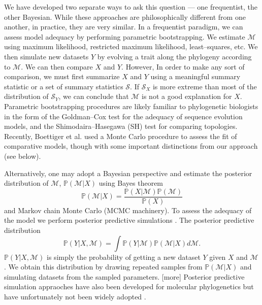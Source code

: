 \documentclass[a4paper,12pt]{article}
\begin{document}
We have developed two separate ways to ask this question --- one frequentist, the other Bayesian. While these approaches are philosophically different from one another, in practice, they are very similar. In a frequentist paradigm, we can assess model adequacy by performing parametric bootstrapping. We estimate $\mathcal{M}$ using maximum likelihood, restricted maximum likelihood, least--squares, etc. We then simulate new datasets $Y$ by evolving a trait along the phylogeny according to $\mathcal{M}$. We can then compare $X$ and $Y$. However, In order to make any sort of comparison, we must first summarize $X$ and $Y$ using a meaningful summary statistic or a set of summary statistics $\mathcal{S}$. If $\mathcal{S}_X$ is more extreme than most of the distribution of $\mathcal{S}_Y$, we can conclude that $\mathcal{M}$ is not a good explanation for $X$. Parametric bootstrapping procedures are likely familiar to phylogenetic biologists in the form of the Goldman--Cox test \citep{Goldman1993} for the adequacy of sequence evolution models, and the Shimodaira--Hasegawa (SH) \citep{SH} test for comparing topologies. Recently, Boettiger et al. \citep{Boettiger2012} used a Monte Carlo procedure to assess the fit of comparative models, though with some important distinctions from our approach (see below).

Alternatively, one may adopt a Bayesian perspective and estimate the posterior distribution of $\mathcal{M}$, $\mathbb{P}(\mathcal{M}|X)$ using Bayes theorem
\[\mathbb{P}(\mathcal{M}|X) = \frac{\mathbb{P}(X|\mathcal{M})\mathbb{P}(\mathcal{M})}{\mathbb{P}(X)} \]
and Markov chain Monte Carlo (MCMC machinery). To assess the adequacy of the model we perform posterior predictive simulations \citep{Rubin1984, Gelman1996}. The posterior predictive distribution
\[\mathbb{P}(Y|X,\mathcal{M}) = \int \mathbb{P}(Y|\mathcal{M})\mathbb{P}(\mathcal{M}|X)d\mathcal{M}. \]
$\mathbb{P}(Y|X,\mathcal{M})$ is simply the probability of getting a new dataset $Y$ given $X$ and $\mathcal{M}$. We obtain this distribution by drawing repeated samples from $\mathbb{P}(\mathcal{M}|X)$ and simulating datasets from the sampled parameters. [more] Posterior predictive simulation appraoches have also been developed for molecular phylogenetics \citep{Bollback2002, Reid2013, Lewis2013, Brown2013} but have unfortunately not been widely adopted \citep{Brown2013}.
\end{document}
